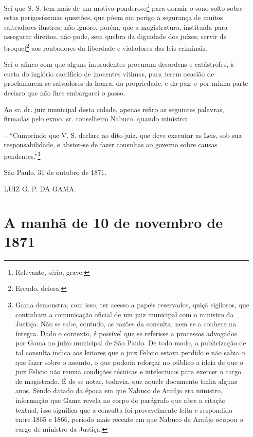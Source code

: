 {Sei que S. S. tem mais de um motivo ponderoso\footnote{ Relevante,
  sério, grave.} para dormir o sono solto sobre estas perigosíssimas
questões, que põem em perigo a segurança de muitos salteadores ilustres;
não ignoro, porém, que a magistratura, instituída para assegurar
direitos, não pode, sem quebra da dignidade dos juízes, servir de
broquel\footnote{ Escudo, defesa.} aos roubadores da liberdade e
violadores das leis criminais.

Sei o afinco com que alguns imprudentes procuram desordens e
catástrofes, à custa do inglório sacrifício de inocentes vítimas, para
terem ocasião de proclamarem-se salvadores da honra, da propriedade, e
da paz; e por minha parte declaro que não lhes embargarei o passo.

Ao sr. dr. juiz municipal desta cidade, apenas refiro as seguintes
palavras, firmadas pelo exmo. sr. conselheiro Nabuco, quando ministro:

-- ``Cumprindo que V. S. declare ao dito juiz, que deve executar as Leis,
sob sua responsabilidade, e abster-se de fazer consultas ao governo
sobre causas pendentes.''\footnote{ Gama demonstra, com isso, ter acesso
  a papeis reservados, quiçá sigilosos, que continham a comunicação
  oficial de um juiz municipal com o ministro da Justiça. Não se sabe,
  contudo, as razões da consulta, nem se a conhece na íntegra. Dado o
  contexto, é possível que se referisse a processos advogados por Gama
  no juízo municipal de São Paulo. De todo modo, a publicização de tal
  consulta indica aos leitores que o juiz Felicio estava perdido e não
  sabia o que fazer sobre o assunto, o que poderia reforçar no público a
  ideia de que o juiz Felicio não reunia condições técnicas e
  intelectuais para exercer o cargo de magistrado. É de se notar,
  todavia, que aquele documento tinha alguns anos. Sendo datado da época
  em que Nabuco de Araújo era ministro, informação que Gama revela no
  corpo do parágrafo que abre a citação textual, isso significa que a
  consulta foi provavelmente feita e respondida entre 1865 e 1866,
  período mais recente em que Nabuco de Araújo ocupou o cargo de
  ministro da Justiça.}

São Paulo, 31 de outubro de 1871.

LUIZ G. P. DA GAMA.

\part{A manhã de 10 de novembro de 1871}

}
